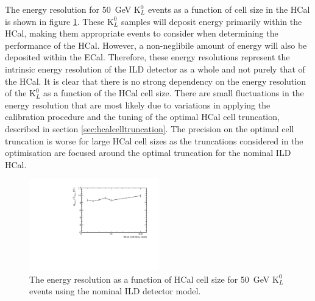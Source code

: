 The energy resolution for 50~GeV $\text{K}^{0}_{L}$ events as a function of cell size in the HCal is shown in figure \ref{fig:hcalcellser}.  These $\text{K}^{0}_{L}$ samples will deposit energy primarily within the HCal, making them appropriate events to consider when determining the performance of the HCal.  However, a non-neglibile amount of energy will also be deposited within the ECal.  Therefore, these energy resolutions represent the intrinsic energy resolution of the ILD detector as a whole and not purely that of the HCal.  It is clear that there is no strong dependency on the energy resolution of the $\text{K}^{0}_{L}$ as a function of the HCal cell size.  There are small fluctuations in the energy resolution that are most likely due to variations in applying the calibration procedure and the tuning of the optimal HCal cell truncation, described in section \ref{sec:hcalcelltruncation}.  The precision on the optimal cell truncation is worse for large HCal cell sizes as the truncations considered in the optimisation are focused around the optimal truncation for the nominal ILD HCal.  

\begin{figure}[h!]
\centering
\includegraphics[width=0.5\textwidth]{OptimisationStudies/Plots/EnergyResolution/ER_vs_HCalCellSize_50GeVKaon0L.pdf}
\caption[The energy resolution as a function of HCal cell size for 50~GeV $\text{K}^{0}_{L}$ events using the nominal ILD detector model.]{The energy resolution as a function of HCal cell size for 50~GeV $\text{K}^{0}_{L}$ events using the nominal ILD detector model.}
\label{fig:hcalcellser}
\end{figure}

